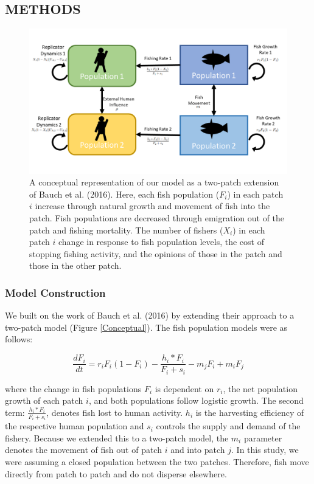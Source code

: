 \documentclass[
]{article}
\begin{document}
\hypertarget{methods-1}{%
\subsection{METHODS}\label{methods-1}}

\begin{figure}
\includegraphics[width=1\linewidth]{CoupledModelConceptual} \caption{A conceptual representation of our model as a two-patch extension of Bauch et al. (2016). Here, each fish population (\(F_i\)) in each patch \(i\) increase through natural growth and movement of fish into the patch. Fish populations are decreased through emigration out of the patch and fishing mortality. The number of fishers (\(X_i\)) in each patch \(i\) change in response to fish population levels, the cost of stopping fishing activity, and the opinions of those in the patch and those in the other patch. \label{Conceptual}}\label{fig:Conceptual}
\end{figure}



\hypertarget{model-construction}{%
\subsubsection{Model Construction}\label{model-construction}}

We built on the work of Bauch et al. (2016) by extending their approach to a two-patch model (Figure \ref{Conceptual}). The fish population models were as follows:

\begin{equation} 
  \frac{dF_i}{dt} = r_iF_i(1-F_i)-\frac{h_i*F_i}{F_i + s_i} - m_jF_i + m_iF_j
  \label{eq:fish1}
\end{equation}

where the change in fish populations \(F_i\) is dependent on \(r_i\), the net population growth of each patch \(i\), and both populations follow logistic growth. The second term: \(\frac{h_i*F_i}{F_i + s_i}\), denotes fish lost to human activity. \(h_i\) is the harvesting efficiency of the respective human population and \(s_i\) controls the supply and demand of the fishery. Because we extended this to a two-patch model, the \(m_i\) parameter denotes the movement of fish out of patch \(i\) and into patch \(j\). In this study, we were assuming a closed population between the two patches. Therefore, fish move directly from patch to patch and do not disperse elsewhere.
\end{document}
